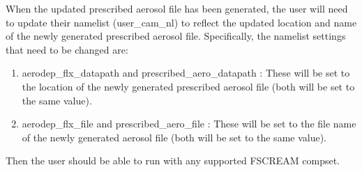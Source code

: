\documentclass[12pt,titlepage]{article}
\numberwithin{equation}{section}
\begin{document}
When the updated prescribed aerosol file has been generated, the user will need to update their namelist (user\_cam\_nl) to reflect the updated location and name of the newly generated prescribed aerosol file.  Specifically, the namelist settings that need to be changed are:
\begin{enumerate}
  \item aerodep\_flx\_datapath and prescribed\_aero\_datapath : These will be set to the location of the newly generated prescribed aerosol file (both will be set to the same value).
  \item aerodep\_flx\_file and prescribed\_aero\_file : These will be set to the file name of the newly generated aerosol file (both will be set to the same value).   
\end{enumerate}  

Then the user should be able to run with any supported FSCREAM compset.  
\end{document}
